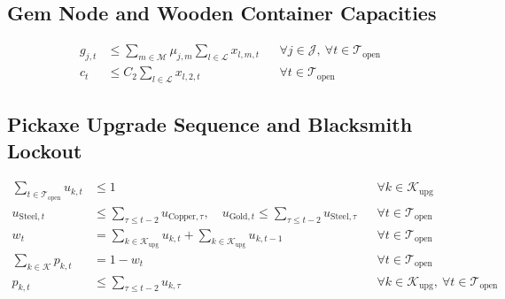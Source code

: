 \documentclass[11pt,a4paper]{article}
\begin{document}
\subsection{Gem Node and Wooden Container Capacities}
\begin{align}
    g_{j,t} &\le \sum_{m \in \mathcal{M}} \mu_{j,m} \sum_{l \in \mathcal{L}} x_{l,m,t} && \forall j \in \mathcal{J},\ \forall t \in \mathcal{T}_{\text{open}} \\
    c_t &\le C_2 \sum_{l \in \mathcal{L}} x_{l,2,t} && \forall t \in \mathcal{T}_{\text{open}}
\end{align}

\subsection{Pickaxe Upgrade Sequence and Blacksmith Lockout}
\begin{align}
    \sum_{t \in \mathcal{T}_{\text{open}}} u_{k,t} &\le 1 && \forall k \in \mathcal{K}_{\text{upg}} \\
    u_{\text{Steel},t} &\le \sum_{\tau \le t-2} u_{\text{Copper},\tau}, \quad u_{\text{Gold},t} \le \sum_{\tau \le t-2} u_{\text{Steel},\tau} && \forall t \in \mathcal{T}_{\text{open}} \\
    w_t &= \sum_{k \in \mathcal{K}_{\text{upg}}} u_{k,t} + \sum_{k \in \mathcal{K}_{\text{upg}}} u_{k,t-1} && \forall t \in \mathcal{T}_{\text{open}} \\
    \sum_{k \in \mathcal{K}} p_{k,t} &= 1 - w_t && \forall t \in \mathcal{T}_{\text{open}} \\
    p_{k,t} &\le \sum_{\tau \le t-2} u_{k,\tau} && \forall k \in \mathcal{K}_{\text{upg}},\ \forall t \in \mathcal{T}_{\text{open}}
\end{align}
\end{document}

